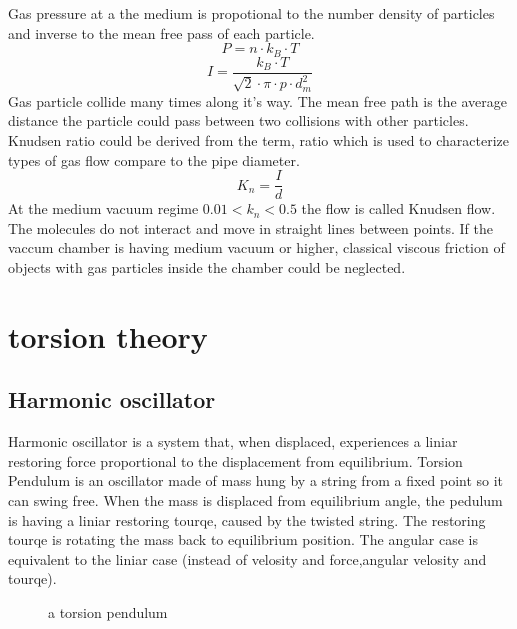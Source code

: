\documentclass[\main/master.tex]{subfiles}
\begin{document}
Gas pressure at a the medium is  propotional to the number density of particles and inverse to the mean free pass of each particle.    
\begin{equation}
P = n\cdot k_B\cdot T  \label{eqn:ideal-gasses}
\end{equation}
\begin{equation}
I = \frac{k_B\cdot T}{\sqrt{2}\cdot\pi\cdot p\cdot d_m^2}     \label{eqn:mean-free-pass}
\end{equation}
Gas particle collide many times along it's way. The mean free path is the average distance the particle could pass between two collisions with other particles. Knudsen ratio could be derived from the term, ratio which is used to characterize types of gas flow compare to the pipe diameter.
\begin{equation}
K_n = \frac{I}{d}     \label{eqn:mean-free-pass}
\end{equation}
At the medium vacuum regime $0.01<k_n<0.5$ the flow is called Knudsen flow. The molecules do not interact and move in straight lines between points. If the vaccum chamber is having medium vacuum or higher, classical viscous friction of objects with gas particles inside the chamber could be neglected.



\section{torsion theory}
\subsection{Harmonic oscillator}
Harmonic oscillator is a system that, when displaced, experiences a liniar restoring force proportional to the displacement from equilibrium. Torsion Pendulum is an oscillator made of mass hung by a string from a fixed point so it can swing free. When the mass is displaced from equilibrium angle, the pedulum is having a liniar restoring tourqe, caused by the twisted string. The restoring tourqe is rotating the mass back to equilibrium position. The angular case is equivalent to the liniar case (instead of velosity and force,angular velosity and tourqe).
\par
\begin{figure}[htbp]
	\centering
	\caption[pendulum]{a torsion pendulum}
	\label{fig:torsion_pendulum}
\end{figure}
\end{document}
